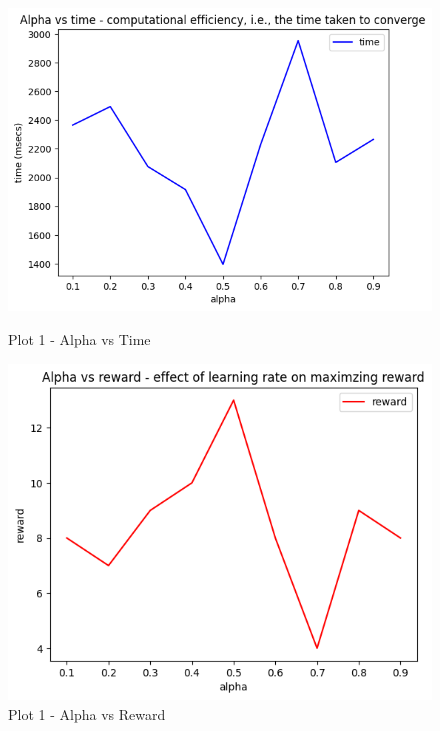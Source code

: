 \documentclass[conference]{IEEEtran}
\begin{document}
\begin{figure}[htbp]
    \centering
    \begin{minipage}[b]{0.45\linewidth}
        \centering
        \includegraphics[width=\textwidth]{Plots/alpha vs time 2.png}
        \caption{Plot 1 - Alpha vs Time}
        \label{fig:figure1}
    \end{minipage}
    \hfill
    \begin{minipage}[b]{0.45\linewidth}
        \centering
        \includegraphics[width=\textwidth]{Plots/alpha vs reward 2.png}
        \caption{Plot 1 - Alpha vs Reward}
        \label{fig:figure2}
    \end{minipage}


\end{figure}
\end{document}

